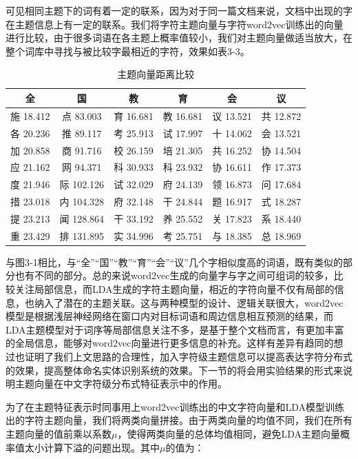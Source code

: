 \documentclass[winfonts,master,oneside,nobackinfo]{njuthesis}
\begin{document}
可见相同主题下的词有着一定的联系，因为对于同一篇文档来说，文档中出现的字在主题信息上有一定的联系。我们将字符主题向量与字符word2vec训练出的向量进行比较，由于很多词语在各主题上概率值较小，我们对主题向量做适当放大，在整个词库中寻找与被比较字最相近的字符，效果如表3-3。

\begin{table}[H]
\centering
\begin{tabular}{cccccc} %
\hline 
全& 国& 教& 育& 会& 议\\
\hline  
施 18.412& 点 83.003& 育 16.681& 教 16.681&议 13.521&共 12.872\\
各 20.236& 推 89.117& 考 25.913& 试 17.997&十 14.062&会 13.521\\
加 20.858& 商 91.716& 校 26.159& 培 21.305&共 16.252&协 14.504\\
应 21.162& 网 94.371& 科 30.933& 科 23.932&协 16.611&作 17.373\\
度 21.946& 际 102.126& 试 32.029& 府 24.139&领 16.873&问 17.684\\
措 23.018& 内 104.328& 府 32.148& 干 24.844&题 16.917&式 18.287\\
提 23.213& 闻 128.864& 干 33.192& 养 25.552&关 17.823&系 18.440\\
重 23.429& 排 131.895& 实 34.996& 考 25.751&与 18.385&总 18.969\\
\hline 
\end{tabular}
\caption{主题向量距离比较}
\end{table}

与图3-1相比，与“全”“国”“教”“育”“会”“议”几个字相似度高的词语，既有类似的部分也有不同的部分。总的来说word2vec生成的向量字与字之间可组词的较多，比较关注局部信息，而LDA生成的字符主题向量，相近的字符向量不仅有局部的信息，也纳入了潜在的主题关联。这与两种模型的设计、逻辑关联很大，word2vec模型是根据浅层神经网络在窗口内对目标词语和周边信息相互预测的结果，而LDA主题模型对于词序等局部信息关注不多，是基于整个文档而言，有更加丰富的全局信息，能够对word2vec向量进行更多信息的补充。这样有差异有趋同的想过也证明了我们上文思路的合理性，加入字符级主题信息可以提高表达字符分布式的效果，提高整体命名实体识别系统的效果。下一节的将会用实验结果的形式来说明主题向量在中文字符级分布式特征表示中的作用。

为了在主题特征表示时同事用上word2vec训练出的中文字符向量和LDA模型训练出的字符主题向量，我们将两类向量拼接。由于两类向量的均值不同，我们在所有主题向量的值前乘以系数$\mu$，使得两类向量的总体均值相同，避免LDA主题向量概率值太小计算下溢的问题出现。其中$\mu$的值为：
\end{document}
